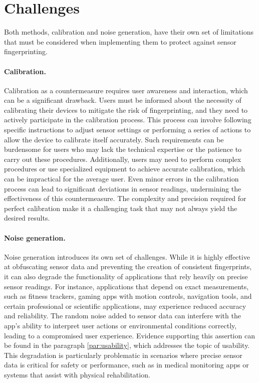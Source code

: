 \documentclass[11pt,
  oneside,openany,    %
]{scrreprt}
\begin{document}
\section{Challenges}
\label{sec:challenges}
Both methods, calibration and noise generation, have their own set of limitations that must be considered when implementing them to protect against sensor fingerprinting.

\paragraph{Calibration.}
\label{par:calibration_disadvantage}
Calibration as a countermeasure requires user awareness and interaction, which can be a significant drawback. 
Users must be informed about the necessity of calibrating their devices to mitigate the risk of fingerprinting, and they need to actively participate in the calibration process. 
This process can involve following specific instructions to adjust sensor settings or performing a series of actions to allow the device to calibrate itself accurately. 
Such requirements can be burdensome for users who may lack the technical expertise or the patience to carry out these procedures. 
Additionally, users may need to perform complex procedures or use specialized equipment to achieve accurate calibration, which can be impractical for the average user. 
Even minor errors in the calibration process can lead to significant deviations in sensor readings, undermining the effectiveness of this countermeasure. 
The complexity and precision required for perfect calibration make it a challenging task that may not always yield the desired results.

\paragraph{Noise generation.}
\label{par:noise_disadvantage}
Noise generation introduces its own set of challenges. 
While it is highly effective at obfuscating sensor data and preventing the creation of consistent fingerprints, it can also degrade the functionality of applications that rely heavily on precise sensor readings. 
For instance, applications that depend on exact measurements, such as fitness trackers, gaming apps with motion controls, navigation tools, and certain professional or scientific applications, may experience reduced accuracy and reliability. 
The random noise added to sensor data can interfere with the app's ability to interpret user actions or environmental conditions correctly, leading to a compromised user experience. 
Evidence supporting this assertion can be found in the paragraph \ref{par:usability}, which addresses the topic of usability.
This degradation is particularly problematic in scenarios where precise sensor data is critical for safety or performance, such as in medical monitoring apps or systems that assist with physical rehabilitation.
\end{document}
